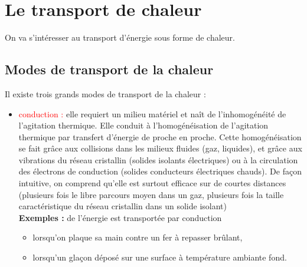 \documentclass[11pt,a4paper]{report}
\begin{document}
\newpage
\section{Le transport de chaleur}

On va s'intéresser au transport d'énergie sous forme de chaleur.

\subsection{Modes de transport de la chaleur}

Il existe trois grands modes de transport de la chaleur :\\
\begin{itemize}
	\item \textcolor{red}{conduction :} elle requiert un milieu matériel et naît de l'inhomogénéité 	de l'agitation thermique. Elle conduit à l'homogénéisation de l'agitation thermique par 			transfert d'énergie de proche en proche. Cette homogénéisation se fait grâce aux collisions 		dans les milieux fluides (gaz, liquides), et grâce aux vibrations du réseau cristallin (solides 	isolants électriques) ou à la circulation des électrons de conduction (solides conducteurs 			électriques chauds). De façon intuitive, on comprend qu'elle est surtout efficace sur de 			courtes distances (plusieurs fois le libre parcours moyen dans un gaz, plusieurs fois la taille 	caractéristique du réseau cristallin dans un solide isolant)\\

	\textbf{Exemples :} de l'énergie est transportée par conduction
	\begin{itemize}
 		\item lorsqu'on plaque sa main contre un fer à repasser brûlant,
		\item lorsqu'un glaçon déposé sur une surface à température ambiante fond.\\
	\end{itemize}
\end{itemize}
\end{document}
